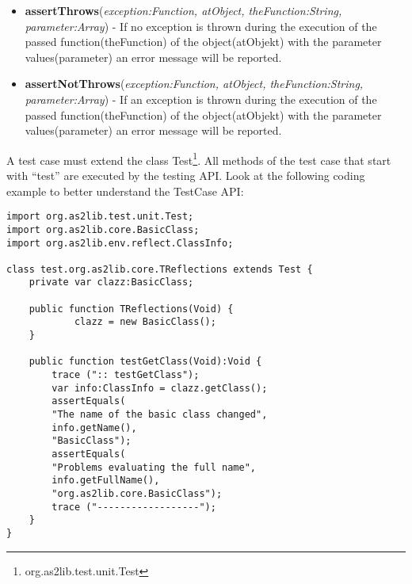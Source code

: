 \begin{itemize}
	\item \textbf{assertThrows}(\textit{exception:Function, atObject, theFunction:String, parameter:Array}) - If no exception is thrown during the execution of the passed function(theFunction) of the object(atObjekt) with the parameter values(parameter) an error message will be reported.
	\item \textbf{assertNotThrows}(\textit{exception:Function, atObject, theFunction:String, parameter:Array}) - If an exception is thrown during the execution of the passed function(theFunction) of the object(atObjekt) with the parameter values(parameter) an error message will be reported.
\end{itemize}

A test case must extend the class Test\footnote{org.as2lib.test.unit.Test}. All methods of the test case that start with ``test'' are executed by the testing API. Look at the following coding example to better understand the TestCase API:
\begin{lstlisting}[frame=single]
import org.as2lib.test.unit.Test;
import org.as2lib.core.BasicClass;
import org.as2lib.env.reflect.ClassInfo;

class test.org.as2lib.core.TReflections extends Test {
	private var clazz:BasicClass;
	
	public function TReflections(Void) {
			clazz = new BasicClass();
	}
	
	public function testGetClass(Void):Void {
		trace (":: testGetClass");
		var info:ClassInfo = clazz.getClass();
		assertEquals(
		"The name of the basic class changed",
		info.getName(),
		"BasicClass");
		assertEquals(
		"Problems evaluating the full name",
		info.getFullName(),
		"org.as2lib.core.BasicClass");
		trace ("------------------");
	}
}
\end{lstlisting}

